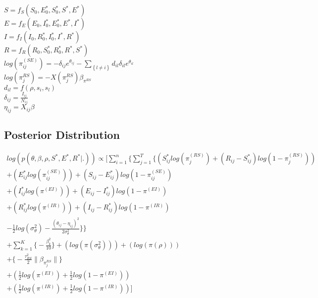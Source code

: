 \documentclass[12pt]{article}
\newcommand \noi {\noindent}
\newcommand \mbreak {\\ \vspace{0.1in}}
\begin{document}
\noi $S = f_S(S_0, E^*_0, S^*_0, S^*, E^*)$ \\

\noi $E = f_E(E_0, I^*_0, E^*_0, E^*, I^*)$ \\

\noi $I = f_I(I_0, R^*_0, I^*_0, I^*, R^*)$ \\

\noi $R = f_R(R_0, S^*_0, R^*_0, R^*, S^*)$ \\

\noi $\displaystyle log(\pi^{(SE)}_{ij}) = -\delta_{ij}e^{\theta_{ij}} - \sum_{\left\{ l \ne i \right\}}d_{il}\delta_{il}e^{\theta_{il}}$\\

\noi $log(\pi_j^{RS}) = -X(\pi_j^{RS}) \beta_{\pi^{RS}}$\\

\noi $d_{il} = f(\rho, s_i, s_l)$\\

\noi $\delta_{ij} = \frac{I_{ij}}{N_{ij}}$ \\

\noi $\eta_{ij} = X_{ij}\beta$\mbreak

\subsection{Posterior Distribution}

\begin{center}
\begin{multline}
\displaystyle
log(p(\theta,\beta,\rho,S^*,E^*,R^*|.)) \propto \Bigg[ 
    \sum_{i=1}^n \bigg\{ \sum_{j=1}^T
        \Big\{
            (S^*_{ij}log(\pi_j^{(RS)}) + (R_{ij} - S^*_{ij})log(1-\pi_j^{(RS)})) \\
            + (E^*_{ij}log(\pi_{ij}^{(SE)})) + (S_{ij} - E^*_{ij})log(1-\pi_{ij}^{(SE)}) \\
            + (I^*_{ij}log(\pi^{(EI)})) + (E_{ij} - I^*_{ij})log(1-\pi^{(EI)}) \\
            + (R^*_{ij}log(\pi^{(IR)})) + (I_{ij} - R^*_{ij})log(1-\pi^{(IR)}) \\
    - \frac{1}{2}log(\sigma^2_{\theta}) - \frac{(\theta_{ij}-\eta_{ij})^2}{2\sigma^2_{\theta}}\Big\}\bigg\} \\
    + \sum_{k = 1}^K\bigg\{-\frac{\beta^2_k}{10}\bigg\}
            + (log(\pi(\sigma^2_{\theta})))
            + (log(\pi(\rho)))\\
            + \bigg\{ -\frac{\tau^2_{RS}}{2}\|\beta_{\pi_j^{RS}}\|  \bigg\} \\ 
            + (\frac{1}{2}log(\pi^{(EI)}) + \frac{1}{2}log(1-\pi^{(EI)})) \\
            + (\frac{1}{2}log(\pi^{(IR)}) + \frac{1}{2}log(1-\pi^{(IR)})) \Bigg]\\
\end{multline}
\end{center}
\end{document}
